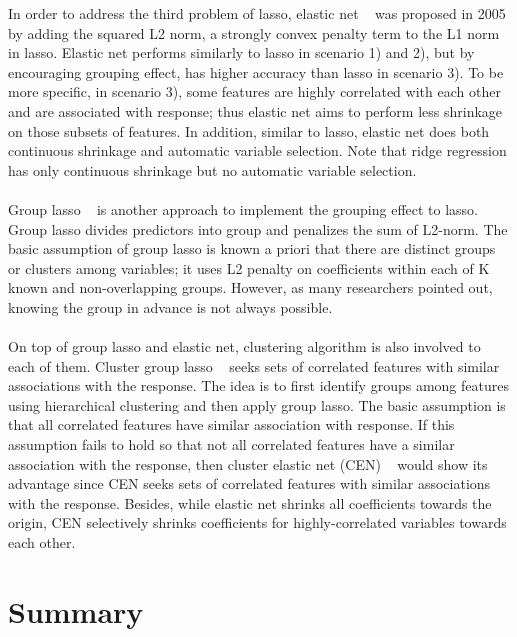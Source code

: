 \documentclass[11pt]{article}
\begin{document}
In order to address the third problem of lasso, elastic net ~\cite{Zou2005Reg} was proposed in 2005 by adding the squared L2 norm, a strongly convex penalty term to the L1 norm in lasso. Elastic net performs similarly to lasso in scenario 1) and 2), but by encouraging grouping effect, has higher accuracy than lasso in scenario 3). To be more specific, in scenario 3), some features are highly correlated with each other and are associated with response; thus elastic net aims to perform less shrinkage on those subsets of features. In addition, similar to lasso, elastic net does both continuous shrinkage and automatic variable selection. Note that ridge regression has only continuous shrinkage but no automatic variable selection.
\\ \\
Group lasso ~\cite{Francis2008Con} is another approach to implement the grouping effect to lasso. Group lasso divides predictors into group and penalizes the sum of L2-norm. The basic assumption of group lasso is known a priori that there are distinct groups or clusters among variables; it uses L2 penalty on coefficients within each of K known and non-overlapping groups. However, as many researchers pointed out, knowing the group in advance is not always possible.
\\ \\
On top of group lasso and elastic net, clustering algorithm is also involved to each of them. Cluster group lasso ~\cite{Peter2013Cor} seeks sets of correlated features with similar associations with the response. The idea is to first identify groups among features using hierarchical clustering and then apply group lasso. The basic assumption is that all correlated features have similar association with response. If this assumption fails to hold so that not all correlated features have a similar association with the response, then cluster elastic net (CEN) ~\cite{Dan2014The} would show its advantage since CEN seeks sets of correlated features with similar associations with the response. Besides, while elastic net shrinks all coefficients towards the origin, CEN selectively shrinks coefficients for highly-correlated variables towards each other. 

\section{Summary}

{}

\end{document}
